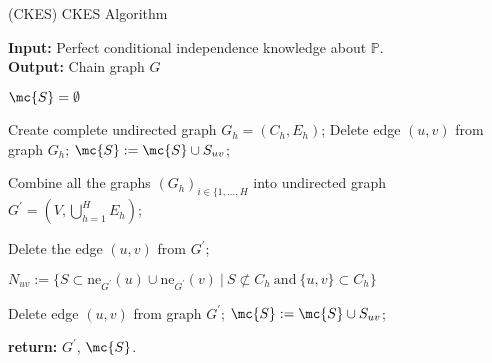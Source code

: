 %
%
%




\begin{algorithm}
	\caption{(CKES) CKES Algorithm} \label{CKESAlG}
	
	\textbf{Input:}	Perfect conditional independence knowledge about $\mathbb{P}$.  \\
	\textbf{Output:} Chain graph $G$

	
	\begin{algorithmic}[1]
			\State $\mc{S} = \emptyset$
	
				\State	Create complete undirected graph $G_h = (C_h, E_h)$;
						\State Delete edge $(u, v)$ from graph $G_h$;
						\State $\mc{S} := \mc{S} \cup S_{uv}$; 
					\EndIf
				\EndFor
			\EndFor			
		
			\State Combine all the graphs $(G_h)_{i \in \{1, \dots, H}$ into undirected graph 
			$G^{'} = (V, \bigcup_{h = 1}^{H} E_h)$;
			
					\State Delete the edge $(u, v)$ from $G^{'}$;
				\EndIf
			\EndFor
			
					
				\State $N_{uv} := \{S \subset \mbox{ne}_{G^{'}}(u) \cup \mbox{ne}_{G^{'}}(v) \ | \ 
									S \not\subset C_h \ \mbox{and} \ \{u, v\} \subset C_h  \}$
									
					\State Delete edge $(u, v)$ from graph $G^{'}$;
					\State $\mc{S} := \mc{S} \cup S_{uv}$; 
				\EndIf
			\EndFor	
			
			\State \textbf{return:} $G^{'}$, $\mc{S}$.
		\EndProcedure
	\end{algorithmic}
\end{algorithm}



